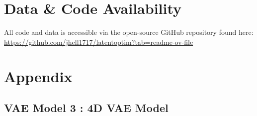 \documentclass{article}
\begin{document}
\newpage{}
\section{Data \& Code Availability}
All code and data is accessible via the open-source GitHub repository found here: 
\url{https://github.com/jhell1717/latentoptim?tab=readme-ov-file}

\newpage{}
\section{Appendix}

\subsection{VAE Model 3 : 4D VAE Model}\label{model3_appendix}
\end{document}
